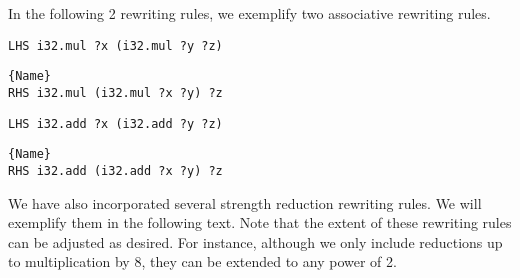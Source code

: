 In the following 2 rewriting rules, we exemplify two associative rewriting rules.


\begin{minipage}{0.95\linewidth}
\begin{minipage}{0.49\linewidth}
    
    \lstset{
    language=ttt,
    style=watcode,
    basicstyle=\footnotesize\ttfamily,
    columns=fullflexible,
    breaklines=true}
    \begin{lstlisting}[]
LHS i32.mul ?x (i32.mul ?y ?z)
            \end{lstlisting}\vspace{-0.5cm}
    \noindent\hrulefill
        \lstset{
            language=ttt,
            style=watcode,
            basicstyle=\footnotesize\ttfamily,
            columns=fullflexible,
            breaklines=true}
            \vspace{-0.2cm}
            \begin{lstlisting}[numbers=none]{Name}
RHS i32.mul (i32.mul ?x ?y) ?z
    \end{lstlisting}
\end{minipage}
\begin{minipage}{0.49\linewidth}
    \lstset{
    language=ttt,
    style=watcode,
    basicstyle=\footnotesize\ttfamily,
    columns=fullflexible,
    breaklines=true}
    \begin{lstlisting}[]
LHS i32.add ?x (i32.add ?y ?z)
            \end{lstlisting}\vspace{-0.5cm}
    \noindent\hrulefill
        \lstset{
            language=ttt,
            style=watcode,
            basicstyle=\footnotesize\ttfamily,
            columns=fullflexible,
            breaklines=true}
            \vspace{-0.2cm}
            \begin{lstlisting}[numbers=none]{Name}
RHS i32.add (i32.add ?x ?y) ?z
    \end{lstlisting}
\end{minipage}    
\end{minipage}

We have also incorporated several strength reduction rewriting rules.
We will exemplify them in the following text.
Note that the extent of these rewriting rules can be adjusted as desired.
For instance, although we only include reductions up to multiplication by 8, they can be extended to any power of 2.

